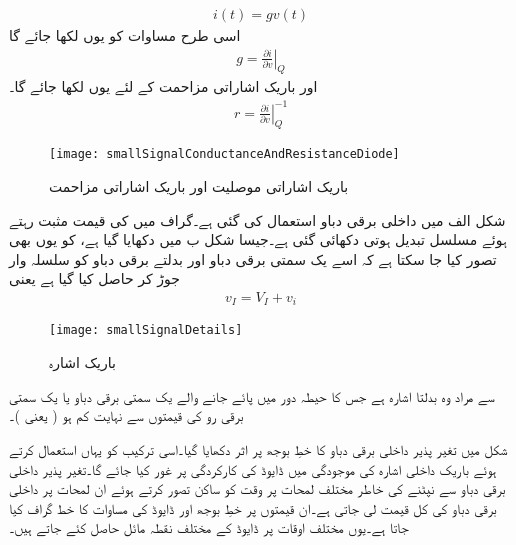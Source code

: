 \begin{align} \label{مساوات_موصلیت_نما_کے_استعمال_سے_رو_کا_حصول}
i(t)= g v(t)
\end{align}
اسی طرح مساوات   کو یوں لکھا جائے گا
\begin{align} \label{مساوات_موصلیت_نما_کی_تعریف}
g = \left .  \frac{\partial  i}{\partial v} \right |_Q
\end{align}
اور باریک اشاراتی مزاحمت  کے لئے یوں لکھا جائے گا۔
\begin{align}
r=\left . \frac{\partial i}{\partial v} \right|_Q ^{-1}
\end{align}

\begin{figure}
\centering
\texttt{[image: smallSignalConductanceAndResistanceDiode]}
\caption{ باریک اشاراتی موصلیت اور باریک اشاراتی مزاحمت}
\label{شکل_ڈایوڈ_کا_باریک_اشاراتی_مزاحمت}
\end{figure}
 \label{حصہ_باریک_اشاراتی_تجزیہ}
شکل  الف میں داخلی برقی دباو  استعمال کی گئی ہے۔گراف میں     کی قیمت مثبت رہتے ہوئے مسلسل تبدیل ہوتی دکھائی گئی ہے۔جیسا شکل  ب میں دکھایا گیا ہے،   کو یوں بھی تصور کیا جا سکتا ہے کہ اسے یک سمتی برقی دباو   اور بدلتے برقی دباو   کو سلسلہ وار جوڑ کر حاصل کیا گیا ہے یعنی
\begin{align}
v_I = V_I+v_i
\end{align}
%
\begin{figure}
\centering
\texttt{[image: smallSignalDetails]}
\caption{باریک اشارہ}
\label{شکل_باریک_اشارہ}
\end{figure}

  سے مراد وہ بدلتا اشارہ ہے جس کا حیطہ دور میں پائے جانے والے یک سمتی برقی دباو یا  یک سمتی برقی رو کی قیمتوں سے نہایت کم ہو ( یعنی  )۔

شکل   میں تغیر پذیر داخلی برقی دباو کا خطِ بوجھ پر اثر دکھایا گیا۔اسی ترکیب کو یہاں استعمال کرتے ہوئے باریک داخلی اشارہ   کی موجودگی میں ڈایوڈ کی کارکردگی پر غور کیا جائے گا۔تغیر پذیر داخلی برقی دباو   سے نپٹنے کی خاطر مختلف لمحات پر وقت کو ساکن تصور کرتے ہوئے ان لمحات پر داخلی برقی دباو کی کل قیمت لی جاتی ہے۔ان قیمتوں پر خطِ بوجھ اور ڈایوڈ کی مساوات کا خط گراف کیا جاتا ہے۔یوں مختلف اوقات پر ڈایوڈ کے مختلف نقطہ مائل   حاصل کئے جاتے ہیں۔

